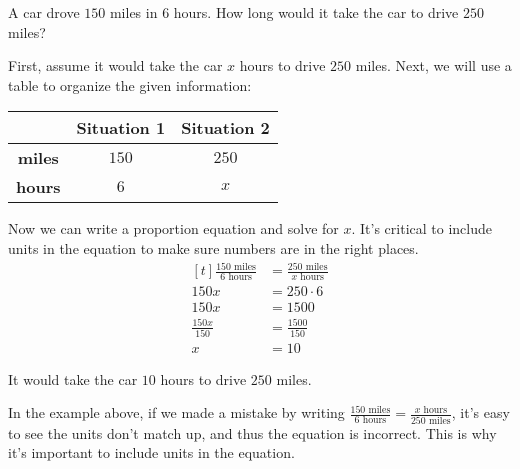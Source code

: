 \begin{myexample}
A car drove $150$ miles in $6$ hours. How long would it take the car to drive $250$ miles?
\end{myexample}
\begin{solution}
First, assume it would take the car $x$ hours to drive $250$ miles. Next, we will use a table to organize the given information:

\begin{center}
\begin{tabular}{ | c | c | c | }
	\hline
    	& \textbf{Situation 1} & \textbf{Situation 2} \\ \hline
  \textbf{miles} & $150$ & $250$ \\ \hline
  \textbf{hours} & $6$ & $x$ \\ \hline
\end{tabular}
\end{center}

Now we can write a proportion equation and solve for $x$. It's critical to include units in the equation to make sure numbers are in the right places.
\[
\begin{aligned}[t]
	\frac{150 \text{ miles}}{6 \text{ hours}} &= \frac{250 \text{ miles}}{x \text{ hours}} \\
	150x &= 250 \cdot 6 \\
	150x &= 1500 \\
	\frac{150x}{150} &= \frac{1500}{150} \\
	x &= 10
\end{aligned}
\]

It would take the car $10$ hours to drive $250$ miles.
\end{solution}

In the example above, if we made a mistake by writing $\frac{150 \text{ miles}}{6 \text{ hours}} = \frac{x \text{ hours}}{250 \text{ miles}}$, it's easy to see the units don't match up, and thus the equation is incorrect. This is why it's important to include units in the equation.

